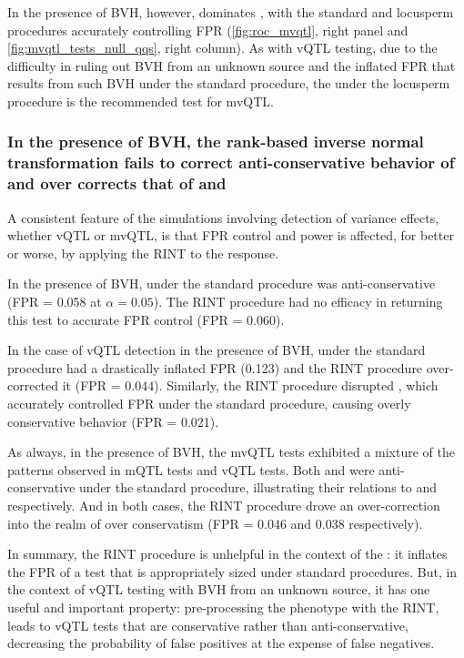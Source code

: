         In the presence of BVH, however, \DGLMmv dominates \Caomv, with the standard and locusperm procedures accurately controlling FPR (\autoref{fig:roc_mvqtl}, right panel and \autoref{fig:mvqtl_tests_null_qqs}, right column).
        As with vQTL testing, due to the difficulty in ruling out BVH from an unknown source and the inflated FPR that results from such BVH under the standard procedure, the \DGLMmv under the locusperm procedure is the recommended test for mvQTL.


\subsubsection{In the presence of BVH, the rank-based inverse normal transformation fails to correct anti-conservative behavior of \DGLMm and over corrects that of \DGLMv and \DGLMmv}
A consistent feature of the simulations involving detection of variance effects, whether vQTL or mvQTL, is that FPR control and power is affected, for better or worse, by applying the RINT to the response.

In the presence of BVH, \DGLMm under the standard procedure was anti-conservative (FPR = 0.058 at $\alpha = 0.05$).
The RINT procedure had no efficacy in returning this test to accurate FPR control (FPR = 0.060).

In the case of vQTL detection in the presence of BVH, \Caov under the standard procedure had a drastically inflated FPR (0.123) and the RINT procedure over-corrected it (FPR = 0.044).
Similarly, the RINT procedure disrupted \DGLMv, which accurately controlled FPR under the standard procedure, causing overly conservative behavior (FPR = 0.021).

As always, in the presence of BVH, the mvQTL tests exhibited a mixture of the patterns observed in mQTL tests and vQTL tests.
Both \Caomv and \DGLMmv were anti-conservative under the standard procedure, illustrating their relations to \Caov and \DGLMm respectively.
And in both cases, the RINT procedure drove an over-correction into the realm of over conservatism (FPR = 0.046 and 0.038 respectively).

In summary, the RINT procedure is unhelpful in the context of the \DGLMm: it inflates the FPR of a test that is appropriately sized under standard procedures.
But, in the context of vQTL testing with BVH from an unknown source, it has one useful and important property:
    pre-processing the phenotype with the RINT, leads to vQTL tests that are conservative rather than anti-conservative, decreasing the probability of false positives at the expense of false negatives.

